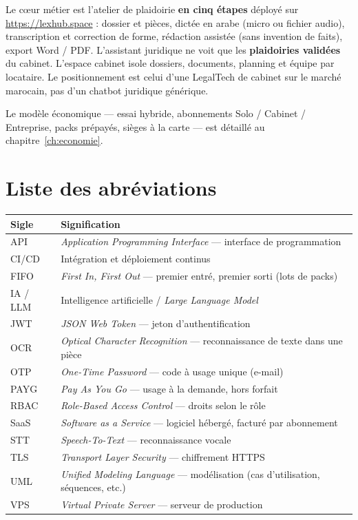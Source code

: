 Le cœur métier est l'atelier de plaidoirie \textbf{en cinq étapes} déployé sur \url{https://lexhub.space} : dossier et pièces, dictée en arabe (micro ou fichier audio), transcription et correction de forme, rédaction assistée (sans invention de faits), export Word / PDF. L'assistant juridique ne voit que les \textbf{plaidoiries validées} du cabinet. L'espace cabinet isole dossiers, documents, planning et équipe par locataire. Le positionnement est celui d'une LegalTech de cabinet sur le marché marocain, pas d'un chatbot juridique générique.

Le modèle économique --- essai hybride, abonnements Solo / Cabinet / Entreprise, packs prépayés, sièges à la carte --- est détaillé au chapitre~\ref{ch:economie}.
 

\chapter*{Liste des abréviations}

\begin{table}[H]
\centering
\small
\begin{tabular}{@{}lp{10.6cm}@{}}
\toprule
\textbf{Sigle} & \textbf{Signification} \\
\midrule
API & \textit{Application Programming Interface} --- interface de programmation \\
CI/CD & Intégration et déploiement continus \\
FIFO & \textit{First In, First Out} --- premier entré, premier sorti (lots de packs) \\
IA / LLM & Intelligence artificielle / \textit{Large Language Model} \\
JWT & \textit{JSON Web Token} --- jeton d'authentification \\
OCR & \textit{Optical Character Recognition} --- reconnaissance de texte dans une pièce \\
OTP & \textit{One-Time Password} --- code à usage unique (e-mail) \\
PAYG & \textit{Pay As You Go} --- usage à la demande, hors forfait \\
RBAC & \textit{Role-Based Access Control} --- droits selon le rôle \\
SaaS & \textit{Software as a Service} --- logiciel hébergé, facturé par abonnement \\
STT & \textit{Speech-To-Text} --- reconnaissance vocale \\
TLS & \textit{Transport Layer Security} --- chiffrement HTTPS \\
UML & \textit{Unified Modeling Language} --- modélisation (cas d'utilisation, séquences, etc.) \\
VPS & \textit{Virtual Private Server} --- serveur de production \\
\bottomrule
\end{tabular}
\end{table}

\clearpage
\tableofcontents
\clearpage
{}
\listoffigures
\clearpage
{}
\listoftables
